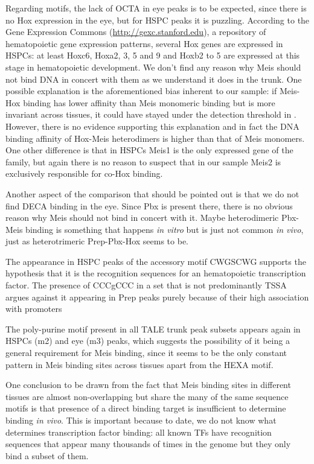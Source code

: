 Regarding motifs, the lack of \ac{OCTA} in eye peaks is to be expected, since there is no Hox expression in the eye, but for \ac{HSPC} peaks it is puzzling. According to the Gene Expression Commons (\url{http://gexc.stanford.edu}), a repository of hematopoietic gene expression patterns, several Hox genes are expressed in \acp{HSPC}: at least Hoxc6, Hoxa2, 3, 5 and 9 and Hoxb2 to 5 are expressed at this stage in hematopoietic development. We don't find any reason why Meis should not bind DNA in concert with them as we understand it does in the trunk. One possible explanation is the aforementioned bias inherent to our sample: if Meis-Hox binding has lower affinity than Meis monomeric binding but is more invariant across tissues, it could have stayed under the detection threshold in \textcite{Wilson2010}. However, there is no evidence supporting this explanation and in fact the DNA binding affinity of Hox-Meis heterodimers is higher than that of Meis monomers. One other difference is that in \acp{HSPC} Meis1 is the only expressed gene of the family, but again there is no reason to suspect that in our sample Meis2 is exclusively responsible for co-Hox binding.


Another aspect of the comparison that should be pointed out is that we do not find \ac{DECA} binding in the eye. Since Pbx is present there, there is no obvious reason why Meis should not bind in concert with it. Maybe heterodimeric Pbx-Meis binding is something that happens \textit{in vitro} but is just not common \textit{in vivo}, just as heterotrimeric Prep-Pbx-Hox seems to be.

The appearance in \ac{HSPC} peaks of the accessory motif  CWGSCWG supports the hypothesis that it is the recognition sequences for an hematopoietic transcription factor. The presence of CCCgCCC in a set that is not predominantly \ac{TSSA} argues against it appearing in Prep peaks purely because of their high association with promoters

The poly-purine motif present in all \ac{TALE} trunk peak subsets appears again in \acp{HSPC} (m2) and eye (m3) peaks, which suggests the possibility of it being a general requirement for Meis binding, since it seems to be the only constant pattern in Meis binding sites across tissues apart from the \ac{HEXA} motif. 

One conclusion to be drawn from the fact that Meis binding sites in different tissues are almost non-overlapping but share the many of the same sequence motifs is that presence of a direct binding target is insufficient to determine binding \textit{in vivo}. This is important because to date, we do not know what determines transcription factor binding: all known \acp{TF} have recognition sequences that appear many thousands of times in the genome but they only bind a subset of them.

